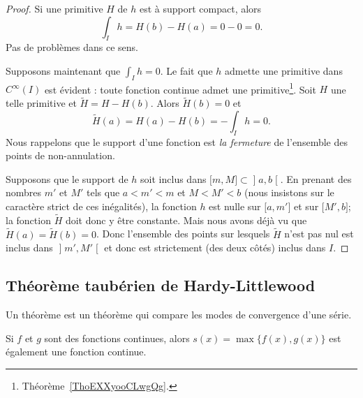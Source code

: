 \begin{proof}
    Si une primitive \( H\) de \( h\) est à support compact, alors
    \begin{equation}
        \int_Ih=H(b)-H(a)=0-0=0.
    \end{equation}
    Pas de problèmes dans ce sens.

    Supposons maintenant que \( \int_Ih=0\). Le fait que \( h\) admette une primitive dans \(  C^{\infty}(I)\) est évident : toute fonction continue admet une primitive\footnote{Théorème~\ref{ThoEXXyooCLwgQg}.}. Soit \( H\) une telle primitive et \( \tilde H=H-H(b)\). Alors \( \tilde H(b)=0\) et
    \begin{equation}
        \tilde H(a)=H(a)-H(b)=-\int_Ih=0.
    \end{equation}
    Nous rappelons que le support d'une fonction est \emph{la fermeture} de l'ensemble des points de non-annulation.

    Supposons que le support de \( h\) soit inclus dans \( \mathopen[ m , M \mathclose]\subset\mathopen] a , b \mathclose[\). En prenant des nombres \( m'\) et \( M'\) tels que \( a<m'<m\) et \( M<M'<b\) (nous insistons sur le caractère strict de ces inégalités), la fonction \( h\) est nulle sur \( \mathopen[ a , m' \mathclose]\) et sur \( \mathopen[ M' , b \mathclose]\); la fonction \( \tilde H\) doit donc y être constante. Mais nous avons déjà vu que \( \tilde H(a)=\tilde H(b)=0\). Donc l'ensemble des points sur lesquels \( \tilde H\) n'est pas nul est inclus dans \( \mathopen] m' , M' \mathclose[\) et donc est strictement (des deux côtés) inclus dans \( I\).
\end{proof}

\subsection{Théorème taubérien de Hardy-Littlewood}

Un théorème  est un théorème qui compare les modes de convergence d'une série.

\begin{lemma}
    Si \( f\) et \( g\) sont des fonctions continues, alors \( s(x)=\max\{ f(x),g(x) \}\) est également une fonction continue.
\end{lemma}

